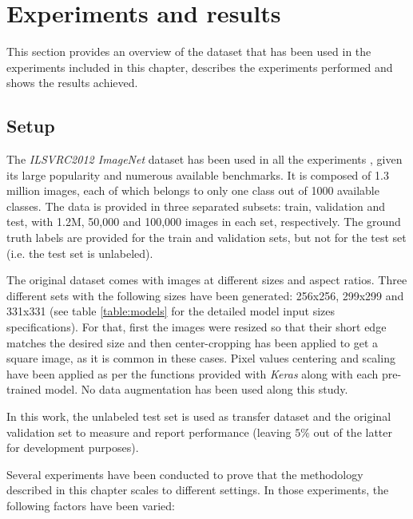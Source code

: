  \section{Experiments and results} \label{sec:distillation_experiments}
This section provides an overview of the dataset that has been used in the experiments included in this chapter, describes the experiments performed and shows the results achieved.

 \subsection{Setup}
 The \textit{ILSVRC2012 ImageNet} dataset has been used in all the experiments \autocite{ILSVRC15}, given its large popularity and numerous available benchmarks. It is composed of 1.3 million images,  each of which belongs to only one class out of 1000 available classes. The data is provided in three separated subsets: train, validation and test, with 1.2M, 50,000 and 100,000 images in each set, respectively. The ground truth labels are provided for the train and validation sets, but not for the test set (i.e. the test set is unlabeled).

 The original dataset comes with images at different sizes and aspect ratios. Three different sets with the following sizes have been generated: 256x256, 299x299 and 331x331 (see table \ref{table:models} for the detailed model input sizes specifications). For that, first the images were resized so that their short edge matches the desired size and then center-cropping has been applied to get a square image, as it is common in these cases. Pixel values centering and scaling have been applied as per the functions provided with \textit{Keras} along with each pre-trained model. No data augmentation has been used along this study.

 In this work, the unlabeled test set is used as transfer dataset and the original validation set to measure and report performance (leaving $5\%$ out of the latter for development purposes).

Several experiments have been conducted to prove that the methodology described in this chapter scales to different settings. In those experiments, the following factors have been varied:

